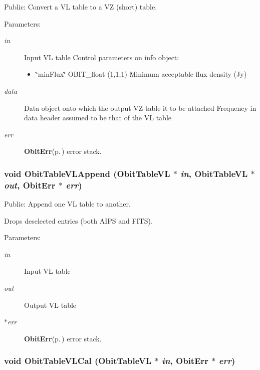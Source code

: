 Public: Convert a VL table to a VZ (short) table. 

\begin{Desc}
\item[Parameters:]
\begin{description}
\item[{\em in}]Input VL table Control parameters on info object: \begin{itemize}
\item \char`\"{}min\-Flux\char`\"{} OBIT\_\-float (1,1,1) Minimum acceptable flux density (Jy) \end{itemize}
\item[{\em data}]Data object onto which the output VZ table it to be attached Frequency in data header assumed to be that of the VL table \item[{\em err}]{\bf Obit\-Err}{\rm (p.\,\pageref{structObitErr})} error stack. \end{description}
\end{Desc}
\subsubsection{\setlength{\rightskip}{0pt plus 5cm}void Obit\-Table\-VLAppend ({\bf Obit\-Table\-VL} $\ast$ {\em in}, {\bf Obit\-Table\-VL} $\ast$ {\em out}, {\bf Obit\-Err} $\ast$ {\em err})}\label{ObitTableVLUtil_8h_a0}


Public: Append one VL table to another. 

Drops deselected entries (both AIPS and FITS). \begin{Desc}
\item[Parameters:]
\begin{description}
\item[{\em in}]Input VL table \item[{\em out}]Output VL table \item[{\em $\ast$err}]{\bf Obit\-Err}{\rm (p.\,\pageref{structObitErr})} error stack. \end{description}
\end{Desc}
\subsubsection{\setlength{\rightskip}{0pt plus 5cm}void Obit\-Table\-VLCal ({\bf Obit\-Table\-VL} $\ast$ {\em in}, {\bf Obit\-Err} $\ast$ {\em err})}\label{ObitTableVLUtil_8h_a6}



